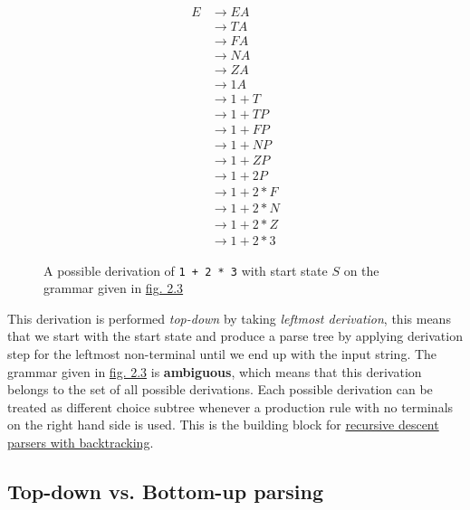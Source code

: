 \begin{figure}[h]
    \begin{equation}
        \begin{split}
            E &\rightarrow EA\\
            &\rightarrow TA\\
            &\rightarrow FA\\
            &\rightarrow NA\\
            &\rightarrow ZA\\
            &\rightarrow 1 A\\
            &\rightarrow 1 + T\\
            &\rightarrow 1 + TP\\
            &\rightarrow 1 + FP\\
            &\rightarrow 1 + NP\\
            &\rightarrow 1 + ZP\\
            &\rightarrow 1 + 2 P\\
            &\rightarrow 1 + 2 * F\\
            &\rightarrow 1 + 2 * N\\
            &\rightarrow 1 + 2 * Z\\
            &\rightarrow 1 + 2 * 3
        \end{split}
        \nonumber
    \end{equation}
    \vspace{-1.5em}
    \cprotect\caption{\label{fig:2.4}A possible derivation of \verb|1 + 2 * 3| with start state $S$ on the grammar given in \hyperref[fig:2.3]{fig. 2.3}}
\end{figure}

This derivation is performed \textit{top-down} by taking \textit{leftmost derivation}, this means that we start with the start state and produce a parse tree by applying derivation step for the leftmost non-terminal until we end up with the input string. The grammar given in \hyperref[fig:2.3]{fig. 2.3} is \textbf{ambiguous}, which means that this derivation belongs to the set of all possible derivations. Each possible derivation can be treated as different choice subtree whenever a production rule with no terminals on the right hand side is used. This is the building block for \hyperref[sec:top-down]{recursive descent parsers with backtracking}.

\subsection{Top-down vs. Bottom-up parsing}

